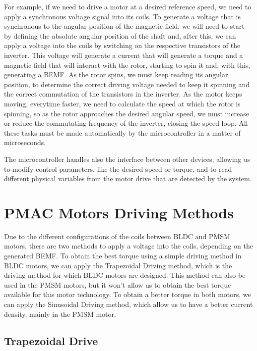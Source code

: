For example, if we need to drive a motor at a desired reference speed, we need to apply a synchronous voltage signal into its coils. To generate a voltage that is synchronous to the angular position of the magnetic field, we will need to start by defining the absolute angular position of the shaft and, after this, we can apply a voltage into the coils by switching on the respective transistors of the inverter. This voltage will generate a current that will generate a torque and a magnetic field that will interact with the rotor, starting to spin it and, with this, generating a \ac{BEMF}. As the rotor spins, we must keep reading its angular position, to determine the correct driving voltage needed to keep it spinning and the correct commutation of the transistors in the inverter. As the motor keeps moving, everytime faster, we need to calculate the speed at which the rotor is spinning, so as the rotor approaches the desired angular speed, we must increase or reduce the commutating frequency of the inverter, closing the speed loop. All these tasks must be made automatically by the microcontroller in a matter of microseconds.

The microcontroller handles also the interface between other devices, allowing us to modify control parameters, like the desired speed or torque, and to read different physical variables from the motor drive that are detected by the system.

\section{PMAC Motors Driving Methods}\label{section:driving_methods}

Due to the different configurations of the coils between \ac{BLDC} and \ac{PMSM} motors, there are two methods to apply a voltage into the coils, depending on the generated \ac{BEMF}. To obtain the best torque using a simple driving method in \ac{BLDC} motors, we can apply the Trapezoidal Driving method, which is the driving method for which \ac{BLDC} motors are designed. This method can also be used in the \ac{PMSM} motors, but it won't allow us to obtain the best torque available for this motor technology. To obtain a better torque in both motors, we can apply the Sinusoidal Driving method, which allow us to have a better current density, mainly in the \ac{PMSM} motor. 

\subsection{Trapezoidal Drive}

